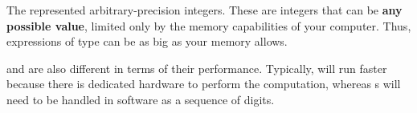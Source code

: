\subsubsection{\texorpdfstring{}{\texttt{Integer}}}\label{subsubsec:Integer_Type}
The   represented arbitrary-precision integers.
These are integers that can be \textbf{any possible value}, limited only by the memory capabilities of your computer.
Thus, expressions of type  can be as big as your memory allows.

 and  are also different in terms of their performance.
Typically,  will run faster because there is dedicated hardware to perform the computation, whereas s will need to be handled in software as a sequence of digits.

\subsubsection{\texorpdfstring{}{\texttt{Float}}}\label{subsubsec:Float_Type}

